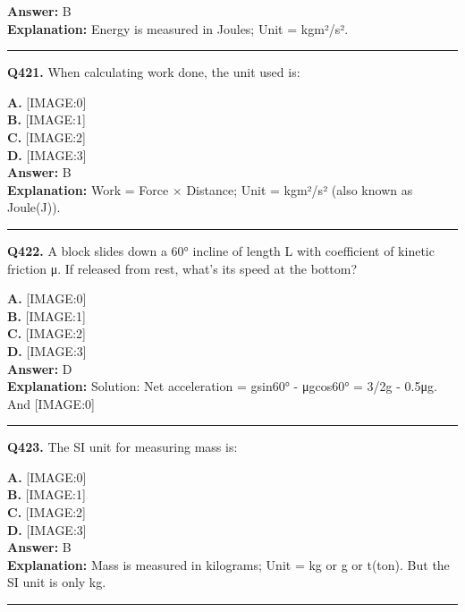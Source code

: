 \documentclass[12pt]{article}
\begin{document}
\textbf{Answer:} B \\
\textbf{Explanation:} Energy is measured in Joules; Unit = kgm²/s².

\hrule
\vspace{1em}


\noindent
\textbf{Q421.} When calculating work done, the unit used is:



\textbf{A.} [IMAGE:0] \\
\textbf{B.} [IMAGE:1] \\
\textbf{C.} [IMAGE:2] \\
\textbf{D.} [IMAGE:3] \\

\textbf{Answer:} B \\
\textbf{Explanation:} Work = Force × Distance; Unit = kgm²/s² (also known as Joule(J)).

\hrule
\vspace{1em}


\noindent
\textbf{Q422.} A block slides down a 60° incline of length L with coefficient of kinetic friction μ. If released from rest, what's its speed at the bottom?



\textbf{A.} [IMAGE:0] \\
\textbf{B.} [IMAGE:1] \\
\textbf{C.} [IMAGE:2] \\
\textbf{D.} [IMAGE:3] \\

\textbf{Answer:} D \\
\textbf{Explanation:} Solution: Net acceleration = gsin60° - μgcos60° = \sqrt{}3/2g - 0.5μg. And
[IMAGE:0]

\hrule
\vspace{1em}


\noindent
\textbf{Q423.} The SI unit for measuring mass is:



\textbf{A.} [IMAGE:0] \\
\textbf{B.} [IMAGE:1] \\
\textbf{C.} [IMAGE:2] \\
\textbf{D.} [IMAGE:3] \\

\textbf{Answer:} B \\
\textbf{Explanation:} Mass is measured in kilograms; Unit = kg or g or t(ton).
But the SI unit is only kg.

\hrule
\vspace{1em}
\end{document}
